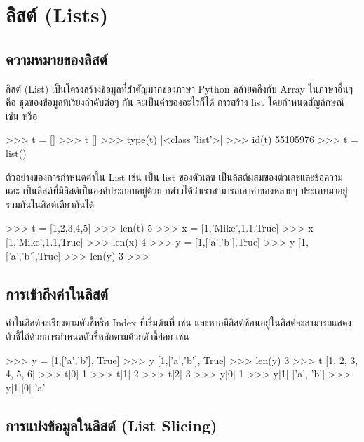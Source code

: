 \chapter{ลิสต์ (Lists)}
\section{ความหมายของลิสต์}

ลิสต์ (List) เป็นโครงสร้างข้อมูลที่สำคัญมากของภาษา Python คล้ายคลึงกับ Array ในภาษาอื่นๆ คือ ชุดของข้อมูลที่เรียงลำดับต่อๆ กัน จะเป็นค่าของอะไรก็ได้ การสร้าง list โดยกำหนดสัญลักษณ์  \pyinline{[]} เช่น   หรือ  

\begin{pycode}
>>> t = []
>>> t
[]
>>> type(t)
|<class \rq{}list\rq{}>|
>>> id(t)
55105976
>>> t = list()
\end{pycode}


ตัวอย่างของการกำหนดค่าใน List เช่น   เป็น list ของตัวเลข   เป็นลิสต์ผสมของตัวเลขและข้อความ และ   เป็นลิสต์ที่มีลิสต์เป็นองค์ประกอบอยู่ด้วย กล่าวได้ว่าเราสามารถเอาค่าของหลายๆ ประเภทมาอยู่รวมกันในลิสต์เดียวกันได้ 

\begin{pycode}
>>> t = [1,2,3,4,5]
>>> len(t)
5
>>> x = [1,'Mike',1.1,True]
>>> x
[1,'Mike',1.1,True]
>>> len(x)
4
>>> y = [1,['a','b'],True]
>>> y
[1,['a','b'],True]
>>> len(y)
3
>>>
\end{pycode}


\section{การเข้าถึงค่าในลิสต์}

ค่าในลิสต์จะเรียงตามตัวชี้หรือ Index ที่เริ่มต้นที่   เช่น  และหากมีลิสต์ซ้อนอยู่ในลิสต์จะสามารถแสดงตัวชี้ได้ด้วยการกำหนดตัวชี้หลักตามด้วยตัวชี้ย่อย เช่น 

\begin{pycode}
>>> y = [1,['a','b'], True]
>>> y
[1,['a','b'], True]
>>> len(y)
3
>>> t
[1, 2, 3, 4, 5, 6]
>>> t[0]
1
>>> t[1]
2
>>> t[2]
3
>>> y[0]
1
>>> y[1]
['a', 'b']
>>> y[1][0]
'a'
\end{pycode}


\section{การแบ่งข้อมูลในลิสต์ (List Slicing)}

